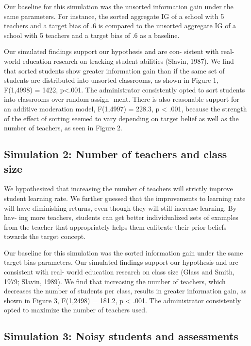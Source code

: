 \documentclass[10pt, letterpaper]{article}
\begin{document}
Our baseline for this simulation was the unsorted information gain under
the same parameters. For instance, the sorted aggregate IG of a school
with 5 teachers and a target bias of .6 is compared to the unsorted
aggregate IG of a school with 5 teachers and a target bias of .6 as a
baseline.

Our simulated findings support our hypothesis and are con- sistent with
real-world education research on tracking student abilities (Slavin,
1987). We find that sorted students show greater information gain than
if the same set of students are distributed into unsorted classrooms, as
shown in Figure 1, F(1,4998) = 1422, p\textless{}.001. The administrator
consistently opted to sort students into classrooms over random assign-
ment. There is also reasonable support for an additive moderation model,
F(1,4997) = 228.3, p \textless{} .001, because the strength of the
effect of sorting seemed to vary depending on target belief as well as
the number of teachers, as seen in Figure 2.

\subsection{Simulation 2: Number of teachers and class
size}\label{simulation-2-number-of-teachers-and-class-size}

We hypothesized that increasing the number of teachers will strictly
improve student learning rate. We further guessed that the improvements
to learning rate will have diminishing returns, even though they will
still increase learning. By hav- ing more teachers, students can get
better individualized sets of examples from the teacher that
appropriately helps them calibrate their prior beliefs towards the
target concept.

Our baseline for this simulation was the sorted information gain under
the same target bias parameters. Our simulated findings support our
hypothesis and are consistent with real- world education research on
class size (Glass and Smith, 1979; Slavin, 1989). We find that
increasing the number of teachers, which decreases the number of
students per class, results in greater information gain, as shown in
Figure 3, F(1,2498) = 181.2, p \textless{} .001. The administrator
consistently opted to maximize the number of teachers used.

\subsection{Simulation 3: Noisy students and
assessments}\label{simulation-3-noisy-students-and-assessments}
\end{document}

